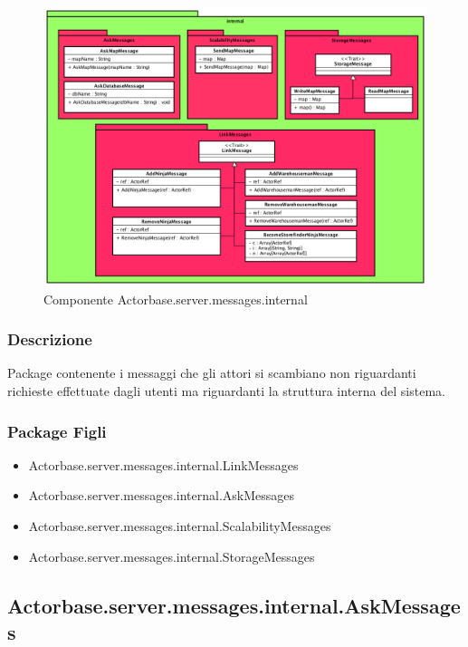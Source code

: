 \documentclass[a4paper]{article}
\begin{document}
			\begin{figure} [H]
				\centering
				\includegraphics[width=\textwidth]{ST/Server/internalLevel.png}
				\caption{Componente Actorbase.server.messages.internal}
			\end{figure}
			
			\subsubsection{Descrizione}
				Package contenente i messaggi che gli attori si scambiano non riguardanti richieste effettuate dagli utenti ma riguardanti la struttura interna del sistema.
				
			\subsubsection{Package Figli}
				\begin{itemize}
					\item Actorbase.server.messages.internal.LinkMessages
					\item Actorbase.server.messages.internal.AskMessages
					\item Actorbase.server.messages.internal.ScalabilityMessages
					\item Actorbase.server.messages.internal.StorageMessages
				\end{itemize}
				

\subsection{Actorbase.server.messages.internal.AskMessages}		
		
\end{document}

